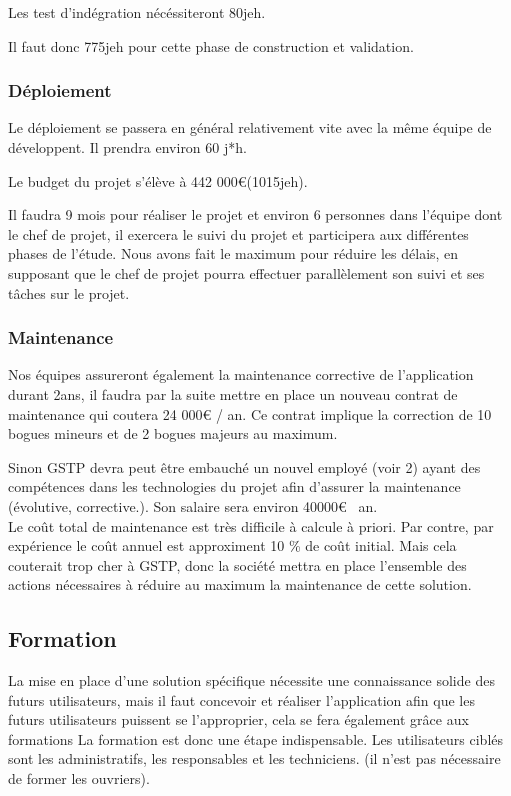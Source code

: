 \begin{description}
\begin{enumerate}
Les test d'indégration nécéssiteront 80jeh.

Il faut donc 775jeh pour cette phase de construction et validation.

\subsubsection{Déploiement}

Le déploiement se passera en général relativement vite avec la même équipe de développent. Il prendra environ 60 j*h.

Le budget du projet s'élève à 442 000€(1015jeh).

Il faudra 9 mois pour réaliser le projet et environ 6 personnes dans l'équipe dont le chef de projet, il exercera le suivi du projet et participera aux différentes phases de l'étude. Nous avons fait le maximum pour réduire les délais, en supposant que le chef de projet pourra effectuer parallèlement son suivi et ses tâches sur le projet.

\subsubsection{Maintenance}


Nos équipes assureront également la maintenance corrective de l'application durant 2ans, il faudra par la suite mettre en place un nouveau contrat de maintenance qui coutera 24 000€ / an. Ce contrat implique la correction de 10 bogues mineurs et de 2 bogues majeurs au maximum.

Sinon GSTP devra peut être embauché un nouvel employé (voir 2) ayant des compétences dans les technologies du projet afin d'assurer la maintenance (évolutive, corrective.). Son salaire sera environ 40000€ \ an.\\

Le coût total de maintenance est très difficile à calcule à priori. 
Par contre, par expérience le coût annuel est approximent  10 \% de coût initial. Mais cela couterait trop cher à GSTP, donc la société mettra
en place l'ensemble des actions nécessaires à réduire au maximum la maintenance de cette solution.

\subsection{Formation}
    La mise en place d'une solution spécifique nécessite une connaissance solide des futurs utilisateurs, mais il faut concevoir et réaliser l'application afin que les futurs utilisateurs puissent se l'approprier, cela se fera également grâce aux formations
      La formation est donc une étape indispensable. Les utilisateurs ciblés sont les administratifs, les responsables et les techniciens. (il n'est pas nécessaire de former les ouvriers).\\


\end{enumerate}
\end{description}
